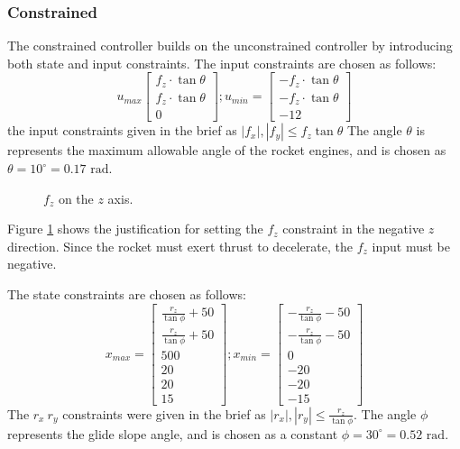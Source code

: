 \documentclass[conference, tikz]{IEEEtran}
\begin{document}
\subsubsection{Constrained}
The constrained controller builds on the unconstrained controller by introducing both state and input constraints. 
The input constraints are chosen as follows:
\[
    u_{max}
    \begin{bmatrix}
    f_z\cdot\tan{\theta}\\
    f_z\cdot\tan{\theta}\\
    0
    \end{bmatrix}
    ;
    u_{min} = 
    \begin{bmatrix}
        -f_z\cdot\tan{\theta}\\
        -f_z\cdot\tan{\theta}\\
        -12
    \end{bmatrix}
\]  
the input constraints given in the brief as $|f_x|, |f_y| \le f_z \tan{\theta} {}$
The angle $\theta$ is represents the maximum allowable angle of the rocket engines, and is chosen as $\theta = 10 ^\circ = 0.17\text{ rad}$.

\begin{figure}[H]
\centering
{}
\caption{$f_z$ on the $z$ axis.} \label{tikz:axes}
\end{figure}

Figure \ref{tikz:axes} shows the justification for setting the $f_z$ constraint in the negative $z$ direction. 
Since the rocket must exert thrust to decelerate, the $f_z$ input must be negative.

The state constraints are chosen as follows:
\[
    x_{max} = 
    \begin{bmatrix}
        \frac{r_z}{\tan{\phi}}+50\\
        \frac{r_z}{\tan{\phi}}+50\\
        500\\
        20\\
        20\\
        15
    \end{bmatrix}
    ;
    x_{min} = 
    \begin{bmatrix}
        -\frac{r_z}{\tan{\phi}}-50\\
        -\frac{r_z}{\tan{\phi}}-50\\
        0\\
        -20\\
        -20\\
        -15
    \end{bmatrix}
\]
The $r_x \ r_y$ constraints were given in the brief as $|r_x|, |r_y| \le \frac{r_z}{\tan{\phi}}$.
The angle $\phi$ represents the glide slope angle, and is chosen as a constant $\phi = 30^\circ = 0.52\text{ rad}$.
\end{document}
